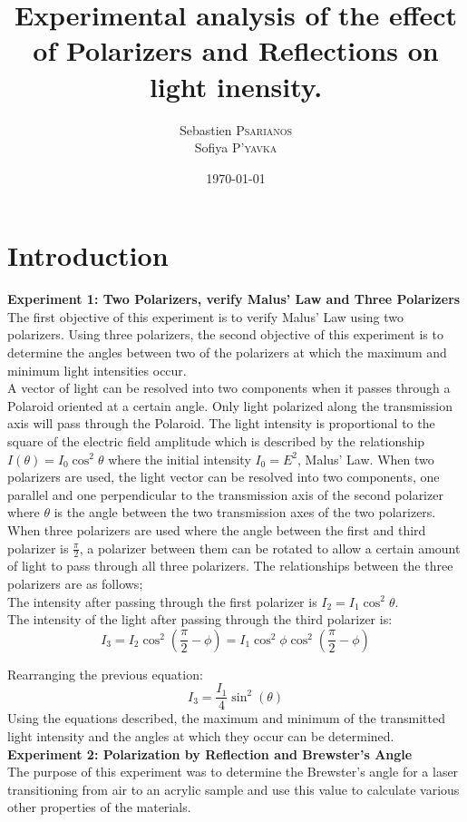 \documentclass[
	letterpaper, %
	10pt, %
]{CSUniSchoolLabReport}
\title{Experimental analysis of the effect of Polarizers and Reflections on light inensity.}
\author{Sebastien \textsc{Psarianos}\\ Sofiya \textsc{P'yavka}}
\date{\today}
\begin{document}
\maketitle

\section{Introduction}
\textbf{Experiment 1: Two Polarizers, verify Malus' Law and Three Polarizers}
The first objective of this experiment is to verify Malus' Law using two polarizers. Using three polarizers, the second objective of this experiment is to determine the angles between two of the polarizers at which the maximum and minimum light intensities occur.\\

A vector of light can be resolved into two components when it passes through a Polaroid oriented at a certain angle. Only light polarized along the transmission axis will pass through the Polaroid. The light intensity is proportional to the square of the electric field amplitude which is described by the relationship $I(\theta)= I_0\cos^2\theta$ where the initial intensity $I_0=E^2$, Malus' Law. When two polarizers are used, the light vector can be resolved into two components, one parallel and one perpendicular to the transmission axis of the second polarizer where $\theta$ is the angle between the two transmission axes of the two polarizers.\\

When three polarizers are used where the angle between the first and third polarizer is $\frac \pi2$, a polarizer between them can be rotated to allow a certain amount of light to pass through all three polarizers. The relationships between the three polarizers are as follows;\\

The intensity after passing through the first polarizer is $I_2=I_1\cos^2\theta$.\\

The intensity of the light after passing through the third polarizer is:
$$I_3=I_2\cos^2\left(\frac \pi2 - \phi\right)=I_1\cos^2\phi\cos^2\left(\frac\pi2 - \phi\right)$$

Rearranging the previous equation:
$$I_3=\frac{I_1}4\sin^2(\theta)$$
Using the equations described, the maximum and minimum of the transmitted light intensity
and the angles at which they occur can be determined.
\newpage
\textbf{Experiment 2: Polarization by Reflection and Brewster's Angle}\\
The purpose of this experiment was to determine the Brewster's angle for a laser transitioning
from air to an acrylic sample and use this value to calculate various other properties of the materials.\\
\end{document}
